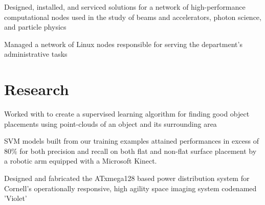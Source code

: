 \documentclass[]{deedy-resume-openfont}
\begin{document}
    \begin{tightemize}
        \item
            Designed, installed, and serviced solutions for a network of
            high-performance computational nodes used in the study of beams
            and accelerators, photon science, and particle physics
        \item
            Managed a network of Linux nodes responsible for serving the
            department’s administrative tasks
    \end{tightemize}
\sectionsep

\section{Research}
            \begin{tightemize}
                \item
                    Worked with  to create a supervised learning
                    algorithm for finding good object placements using
                    point-clouds of an object and its surrounding area
                \item
                    SVM models built from our training examples attained
                    performances in excess of 80\% for both precision and
                    recall on both flat and non-flat surface placement by 
                    a robotic arm
                    equipped with a Microsoft Kinect.
            \end{tightemize}
    \sectionsep

            \begin{tightemize}
                \item
                    Designed and fabricated the ATxmega128 based power
                    distribution system for Cornell’s operationally responsive,
                    high agility space imaging system codenamed 'Violet'
            \end{tightemize}
    \sectionsep
\end{document}
